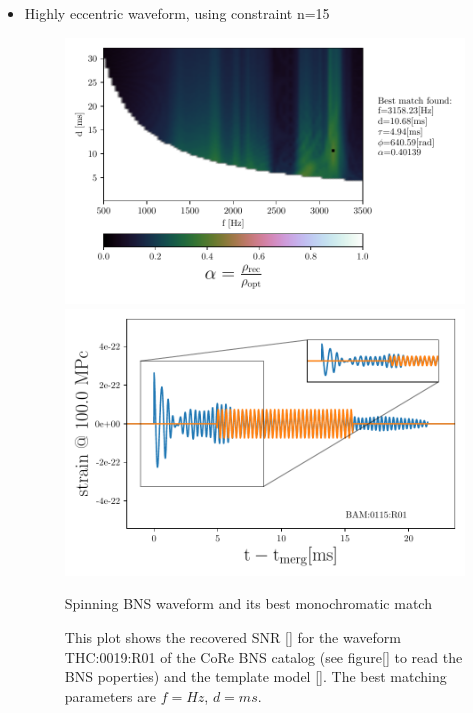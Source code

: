 \begin{itemize}[leftmargin=*]
\FloatBarrier


\item Highly eccentric waveform, using constraint n=15

\begin{figure}[!htbp]
\begin{center}
\begin{minipage}[t]{0.5\linewidth}
\vspace{0pt}
\includegraphics[scale=0.6,trim={2mm 0 35mm 0},clip]{images/Data_analysis/results/2D_grid_15.pdf}
\end{minipage}%
\begin{minipage}[t]{0.5\linewidth}
\vspace{20pt}
\includegraphics[scale=0.45]{images/Data_analysis/results/2D_grid_16.pdf}
\end{minipage}
\captionsetup{width=0.8\textwidth}
\caption{Spinning BNS waveform and its best monochromatic match}
\caption*{This plot shows the recovered SNR \ref{} for the waveform THC:0019:R01 of the CoRe BNS catalog \cite{}(see figure\ref{} to read the BNS poperties) and the template model \ref{}. The best matching parameters are $f=Hz$, $d=ms$.}
\end{center}
\end{figure}

\FloatBarrier

\end{itemize}


